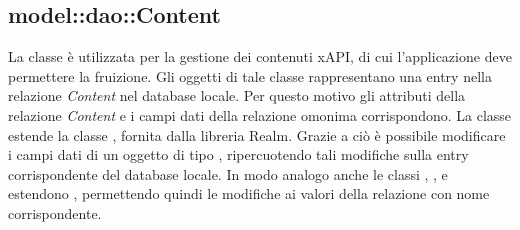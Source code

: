 \documentclass[../Tesi.tex]{subfiles}
\begin{document}
		\subsection{model::dao::Content}
		La classe  è utilizzata per la gestione dei contenuti xAPI, di cui l'applicazione deve permettere la fruizione. Gli oggetti di tale classe rappresentano una entry nella relazione \textit{Content} nel database locale. Per questo motivo gli attributi della relazione \textit{Content} e i campi dati della relazione omonima corrispondono. La classe  estende la classe , fornita dalla libreria Realm. Grazie a ciò è possibile modificare i campi dati di un oggetto di tipo , ripercuotendo tali modifiche sulla entry corrispondente del database locale. In modo analogo anche le classi , ,  e  estendono , permettendo quindi le modifiche ai valori della relazione con nome corrispondente.
\end{document}
